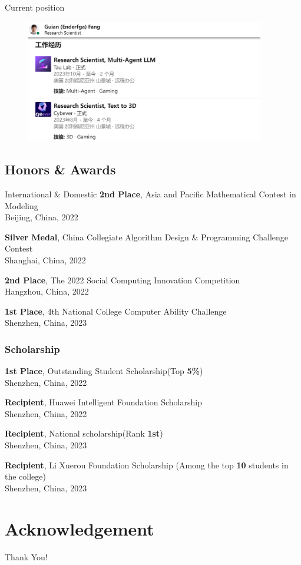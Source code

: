 \documentclass[8pt]{beamer}
\begin{document}
\begin{frame}{Current position}
    \begin{figure}
        \centering
        \includegraphics[width=0.93\textwidth]{demo/position.png}
    \end{figure}
\end{frame}

\subsection{Honors \& Awards}
\begin{frame}{International \& Domestic}
\textbf{2nd Place}, Asia and Pacific Mathematical Contest in Modeling\\
Beijing, China, 2022
\bigskip

\textbf{Silver Medal}, China Collegiate Algorithm Design \& Programming Challenge Contest\\
Shanghai, China, 2022
\bigskip

\textbf{2nd Place}, The 2022 Social Computing Innovation Competition\\
Hangzhou, China, 2022
\bigskip

\textbf{1st Place}, 4th National College Computer Ability Challenge\\
Shenzhen, China, 2023
\end{frame}

\begin{frame}
\frametitle{Scholarship}
\textbf{1st Place}, Outstanding Student Scholarship(Top \textbf{5\%})\\
Shenzhen, China, 2022
\bigskip

\textbf{Recipient}, Huawei Intelligent Foundation Scholarship\\
Shenzhen, China, 2022
\bigskip

\textbf{Recipient}, National scholarship(Rank \textbf{1st})\\
Shenzhen, China, 2023
\bigskip

\textbf{Recipient}, Li Xuerou Foundation Scholarship (Among the top \textbf{10} students in the college)\\
Shenzhen, China, 2023

\end{frame}


\section*{Acknowledgement}  
\begin{frame}
\centering
\textcolor{myNewColorA}{\fontsize{40pt}{50pt}\selectfont Thank You!}
\end{frame}
\end{document}
